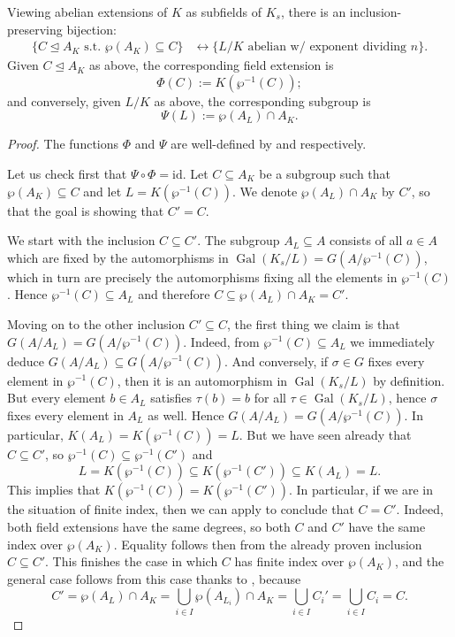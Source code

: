 \documentclass[12pt]{amsart}
\DeclareMathOperator{\Gal}{Gal}
\newcommand{\id}{\mathrm{id}}
\begin{document}
\begin{thm}\label{thm:kummer}
    Viewing abelian extensions of $K$ as subfields of $K_{s}$, there is an inclusion-preserving bijection:
    \begin{align*}
	\{ C\trianglelefteq A_{K} \text{ s.t. } \wp(A_{K})\subseteq C \} & \leftrightarrow \{ L/K \text{ abelian w/ exponent dividing } n\}.
    \end{align*}
    Given $C\trianglelefteq A_{K}$ as above, the corresponding field extension is
    \[ \Phi(C):=K(\wp^{-1}(C)); \]
    and conversely, given $L/K$ as above, the corresponding subgroup is
    \[ \Psi(L):=\wp(A_{L})\cap A_{K}. \]
    \begin{proof}
	The functions $\Phi$ and $\Psi$ are well-defined by  and  respectively.

	Let us check first that $\Psi\circ \Phi=\id$.
	Let $C\subseteq A_{K}$ be a subgroup such that $\wp(A_{K})\subseteq C$ and let $L=K(\wp^{-1}(C))$.
	We denote $\wp(A_{L})\cap A_{K}$ by $C'$, so that the goal is showing that $C'=C$.

	We start with the inclusion $C\subseteq C'$.
	The subgroup $A_{L}\subseteq A$ consists of all $a\in A$ which are fixed by the automorphisms in $\Gal(K_{s}/L)=G(A/\wp^{-1}(C))$, which in turn are precisely the automorphisms fixing all the elements in $\wp^{-1}(C)$.
	Hence $\wp^{-1}(C)\subseteq A_{L}$ and therefore $C\subseteq \wp(A_{L})\cap A_{K}=C'$.

	Moving on to the other inclusion $C'\subseteq C$, the first thing we claim is that $G(A/A_{L})=G(A/\wp^{-1}(C))$.
	Indeed, from $\wp^{-1}(C)\subseteq A_{L}$ we immediately deduce $G(A/A_{L})\subseteq G(A/\wp^{-1}(C))$.
	And conversely, if $\sigma\in G$ fixes every element in $\wp^{-1}(C)$, then it is an automorphism in $\Gal(K_{s}/L)$ by definition.
	But every element $b\in A_{L}$ satisfies $\tau(b)=b$ for all $\tau\in \Gal(K_{s}/L)$, hence $\sigma$ fixes every element in $A_{L}$ as well.
	Hence $G(A/A_{L})=G(A/\wp^{-1}(C))$.
	In particular, $K(A_{L})=K(\wp^{-1}(C))=L$.
	But we have seen already that $C\subseteq C'$, so $\wp^{-1}(C)\subseteq \wp^{-1}(C')$ and
	\[ L=K(\wp^{-1}(C))\subseteq K(\wp^{-1}(C'))\subseteq K(A_{L})=L. \]
	This implies that $K(\wp^{-1}(C))=K(\wp^{-1}(C'))$.
	In particular, if we are in the situation of finite index, then we can apply  to conclude that $C=C'$.
	Indeed, both field extensions have the same degrees, so both $C$ and $C'$ have the same index over $\wp(A_{K})$.
	Equality follows then from the already proven inclusion $C\subseteq C'$.
	This finishes the case in which $C$ has finite index over $\wp(A_{K})$, and the general case follows from this case thanks to , because
	\[ C'=\wp(A_{L})\cap A_{K}=\bigcup_{i\in I}\wp(A_{L_{i}})\cap A_{K}=\bigcup_{i\in I}C_{i}'=\bigcup_{i\in I}C_{i}=C. \]


\end{proof}
\end{thm}
\end{document}
